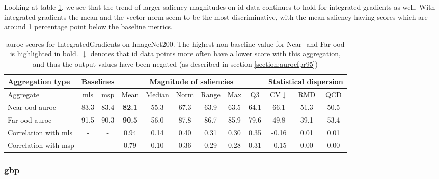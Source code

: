 \documentclass[UKenglish]{uiomasterthesis} %
\theoremstyle{definition}
\begin{document}
Looking at table \ref{table:imagenet200_integratedgradients_metrics}, we see that the trend of larger saliency magnitudes on \ac{id} data continues to hold for integrated gradients as well. With integrated gradients the mean and the vector norm seem to be the most discriminative, with the mean saliency having scores which are around 1 percentage point below the baseline metrics.

\begin{table}[hbtp]
\setlength\tabcolsep{3pt}
\begin{center}
\begin{tabular}{ |p{5.1em}|c c|c c c c c c|c c c| }
    \hline
     \centering Aggregation type & \multicolumn{2}{c|}{Baselines} & \multicolumn{6}{c|}{Magnitude of saliencies} & \multicolumn{3}{p{8em}|}{\centering Statistical dispersion} \\
    \hline
    Aggregate & \ac{mls} & \ac{msp} & Mean & Median & Norm & Range & Max & Q3 & CV$\downarrow$ & RMD & QCD  \\
    \hline
    \rowcolor{near!50}
    Near-\ac{ood} \ac{auroc} & 83.3 & 83.4 &\textbf{ 82.1 }& 55.3 & 67.3 & 63.9 & 63.5 & 64.1 & 66.1 & 51.3 & 50.5  \\
    \hline
    \rowcolor{far!50}
    Far-\ac{ood} \ac{auroc} & 91.5 & 90.3 &\textbf{ 90.5 }& 56.0 & 87.8 & 86.7 & 85.9 & 79.6 & 49.8 & 39.1 & 53.4  \\
    \hline
    Correlation with \ac{mls}& - & - & 0.94 & 0.14 & 0.40 & 0.31 & 0.30 & 0.35 & -0.16 & 0.01 & 0.01  \\
    \hline
    Correlation with \ac{msp}& - & - & 0.79 & 0.10 & 0.36 & 0.29 & 0.28 & 0.31 & -0.15 & 0.00 & 0.00  \\
    \hline
    \end{tabular}
    \caption[\ac{auroc} scores for IntegratedGradients on ImageNet200]{\ac{auroc} scores for IntegratedGradients on ImageNet200. The highest non-baseline value for Near- and Far-\ac{ood} is highlighted in bold. $\downarrow$ denotes that \ac{id} data points more often have a lower score with this aggregation, and thus the output values have been negated (as described in section \ref{section:aurocfpr95})}
    \label{table:imagenet200_integratedgradients_metrics}
\end{center}
\setlength\tabcolsep{6pt}
\end{table}

\subsubsection{\ac*{gbp}}
\end{document}
